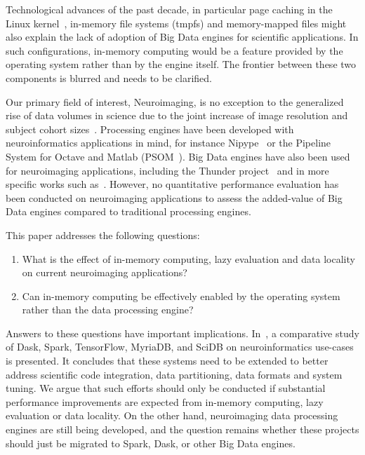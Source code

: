 Technological advances of the past decade, in particular page caching 
in the Linux kernel~\cite{love2010linux}, in-memory file systems 
(tmpfs) and memory-mapped files might also 
explain the lack of adoption of Big Data engines for scientific 
applications. In such configurations, in-memory computing would be a feature 
provided by 
the operating system rather than by the engine itself. The frontier 
between these two components is blurred and needs to be clarified.


Our primary field of interest, Neuroimaging, is no exception to the 
generalized rise of data volumes in science due to the joint increase 
of image resolution and subject cohort sizes~\cite{van2014human}. 
Processing engines have been developed with neuroinformatics 
applications in mind, for instance Nipype~\cite{gorgolewski2011nipype} 
or the Pipeline System for Octave and Matlab 
(PSOM~\cite{bellec2012pipeline}). Big Data engines have also been used for 
neuroimaging applications, including the Thunder 
project~\cite{freeman2014mapping} and in more specific works such 
as~\cite{makkie2019fast}. However, no quantitative performance 
evaluation has been conducted on neuroimaging applications to assess the 
added-value of Big Data engines compared to traditional processing engines.

This paper addresses the following questions:
\begin{enumerate}
\item What is the effect of in-memory computing, lazy evaluation and data locality on current neuroimaging applications?
\item Can in-memory computing be effectively enabled by the operating system rather than the data processing engine?
\end{enumerate}

Answers to these questions have important implications. 
In~\cite{mehta2017comparative}, a comparative study of Dask, Spark, 
TensorFlow, MyriaDB, and SciDB on neuroinformatics use-cases is 
presented. It concludes that these systems need to be extended to 
better address scientific code integration, data partitioning, data 
formats and system tuning. We argue 
that such efforts should only be conducted if substantial performance 
improvements are expected from in-memory computing, lazy 
evaluation or data 
locality. On the other hand, neuroimaging data processing engines are 
still being developed, and the question remains whether these 
projects should just be migrated to Spark, Dask, or other Big Data 
engines.

